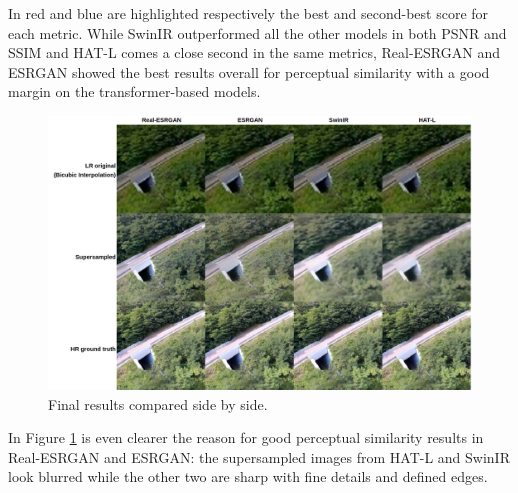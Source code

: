 In red and blue are highlighted respectively the best and second-best score for each metric. While SwinIR outperformed all the other models in both PSNR and SSIM and HAT-L comes a close second in the same metrics, Real-ESRGAN and ESRGAN showed the best results overall for perceptual similarity with a good margin on the transformer-based models.


\begin{figure}[H]

  \includegraphics[scale=0.4]{figures/results/comp_table.png}
  \caption{Final results compared side by side.}
  \label{img:comp_table}
\end{figure}

In Figure \ref{img:comp_table} is even clearer the reason for good perceptual similarity results in Real-ESRGAN and ESRGAN: the supersampled images from HAT-L and SwinIR look blurred while the other two are sharp with fine details and defined edges.
